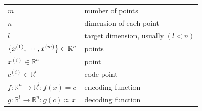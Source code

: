 \begin{customTableWrapper}{1.5}
\begin{longtable}{l p{6cm}}

$m$ & number of points \\

$n$ & dimension of each point \\

$l$ & target dimension, usually $(l<n)$ \\

\hline

$\left\{x^{(1)}, \cdots, x^{(m)}\right\} \in \mathbb{R}^n$ & points \\

$x^{(i)} \in \mathbb{R}^n$ & point \\

$c^{(i)} \in \mathbb{R}^l$ & code point \\

\hline

$f:\mathbb{R}^n \to \mathbb{R}^l : f(x) = c$ & encoding function \\

$g:\mathbb{R}^l \to \mathbb{R}^n:g(c) \approx x$ & decoding function \\

\end{longtable}
\end{customTableWrapper}

